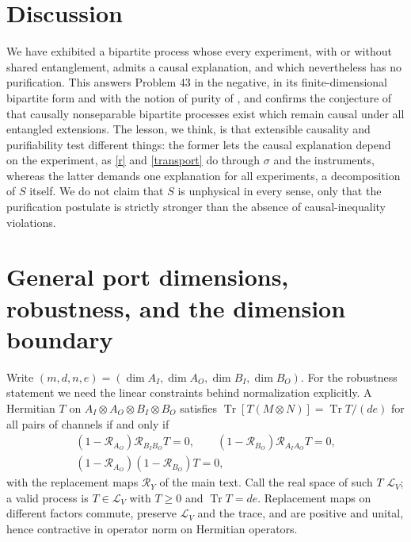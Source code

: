 \documentclass[aps,prl,reprint,superscriptaddress,nofootinbib,longbibliography,raggedbottom]{revtex4-2}
\DeclareMathOperator{\Tr}{Tr}
\newcommand{\R}{\mathcal R}
\begin{document}
\section{Discussion}
We have exhibited a bipartite process whose every experiment, with or
without shared entanglement, admits a causal explanation, and which
nevertheless has no purification. This answers Problem 43 in the negative,
in its finite-dimensional bipartite form and with the notion of purity of
\cite{AFNB}, and confirms the conjecture of \cite{FAB} that causally nonseparable bipartite processes exist which
remain causal under all entangled extensions. The lesson, we think, is that
extensible causality and purifiability test different things: the former
lets the causal explanation depend on the experiment, as \eqref{r} and
\eqref{transport} do through $\sigma$ and the instruments, whereas the
latter demands one explanation for all experiments, a decomposition of $S$
itself. We do not claim that $S$ is unphysical in every sense, only that
the purification postulate is strictly stronger than the absence of
causal-inequality violations.

\appendix
\setcounter{secnumdepth}{1}
\setcounter{equation}{0}
\renewcommand{\theequation}{A\arabic{equation}}
\section{General port dimensions, robustness, and the dimension boundary}
\label{app:general}

Write $(m,d,n,e)=(\dim A_I,\dim A_O,\dim B_I,\dim B_O)$. For the
robustness statement we need the linear constraints behind normalization
explicitly. A Hermitian $T$ on $A_I\otimes A_O\otimes B_I\otimes B_O$
satisfies $\Tr[T(M\otimes N)]=\Tr T/(de)$ for all pairs of channels if and
only if \cite{OCB,Witnesses}
\begin{equation}\label{A:LV}
\begin{gathered}
(1-\R_{A_O})\R_{B_IB_O}T=0,\qquad (1-\R_{B_O})\R_{A_IA_O}T=0,\\
(1-\R_{A_O})(1-\R_{B_O})T=0,
\end{gathered}
\end{equation}
with the replacement maps $\R_Y$ of the main text. Call the real space of
such $T$ $\mathcal L_V$; a valid process is $T\in\mathcal L_V$ with
$T\geq0$ and $\Tr T=de$. Replacement maps on different factors commute,
preserve $\mathcal L_V$ and the trace, and are positive and unital, hence
contractive in operator norm on Hermitian operators.
\end{document}

